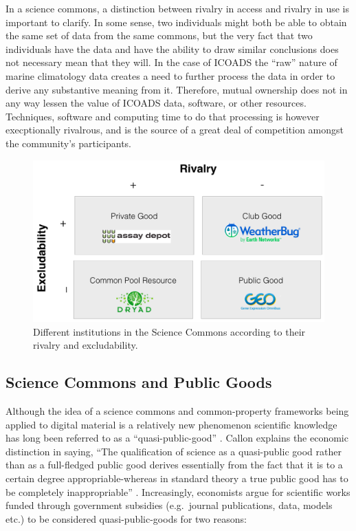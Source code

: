 \documentclass[thesis,tocnosub,noragright,centerchapter,12pt]{uiucecethesis09}
\begin{document}
In a science commons, a distinction between rivalry in access and
rivalry in use is important to clarify. In some sense, two individuals
might both be able to obtain the same set of data from the same commons,
but the very fact that two individuals have the data and have the ability to draw
similar conclusions does not necessary mean that they will. In the case
of ICOADS the ``raw'' nature of marine climatology data creates a need
to further process the data in order to derive any substantive meaning
from it. Therefore, mutual ownership does not in any way lessen the
value of ICOADS data, software, or other resources. Techniques, software and computing time to do that processing is however execptionally rivalrous, and is the source of a great deal of competition amongst the community's participants.\\

\begin{figure}
\centering
\includegraphics[width=\textwidth]{ScienceCommons}
\caption{Different institutions in the Science Commons according to their rivalry and excludability.}
\label{fig:my_label}
\end{figure}


\subsection*{Science Commons and Public Goods}

Although the idea of a science commons and common-property frameworks
being applied to digital material is a relatively new phenomenon
\citep{arzberger2004promoting,wilbanks2006introduction,contreras2010data} 
scientific knowledge has long been referred to as a
``quasi-public-good'' \citep{fuller1993philosophy}. Callon explains the
economic distinction in saying, ``The qualification of science as a
quasi-public good rather than as a full-fledged public good derives
essentially from the fact that it is to a certain degree
appropriable-whereas in standard theory a true public good has to be
completely inappropriable'' \citep[p. 400]{callon1994science}. Increasingly, economists
argue for scientific works funded through government subsidies
(e.g.~journal publications, data, models etc.) to be considered
quasi-public-goods for two reasons:
\end{document}
